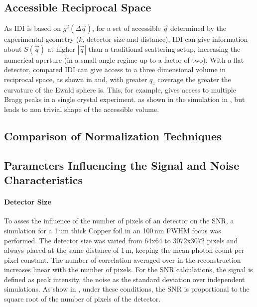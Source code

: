 \subsection{Accessible Reciprocal Space}

	As IDI is based on $g^2(\Delta \vec{q})$, for a set of accessible $\vec{q}$ determined by the experimental geometry ($k$, detector size and distance), IDI can give information about $S(\vec{q})$ at higher $\left|\vec{q}\right|$ than a traditional scattering setup, increasing the numerical aperture (in a small angle regime up to a factor of two). With a flat detector, compared  IDI can give access to a three dimensional volume in reciprocal space, as shown in  and, with greater $q_z$ coverage the greater the curvature of the Ewald sphere is. This, for example, gives access to multiple Bragg peaks in a single crystal experiment. 
	 as shown in the simulation in , but leads to non trivial shape of the accessible volume. 
	 
\subsection{Comparison of Normalization Techniques}

\subsection{Parameters Influencing the Signal and Noise Characteristics}
\paragraph{Detector Size}
	
	To asses the influence of the number of pixels of an detector on the SNR, a simulation for a 1\,um thick Copper foil in an 100\,nm FWHM focus was performed. The detector size was varied from 64x64 to 3072x3072 pixels and always placed at the same distance of 1\,m, keeping the mean photon count per pixel constant. The number of correlation averaged over in the reconstruction increases linear with the number of pixels. For the SNR calculations, the signal is defined as peak intensity, the noise as the standard deviation over independent simulations.  As show in , under these conditions, the SNR is proportional to the square root of the number of pixels of the detector. 



